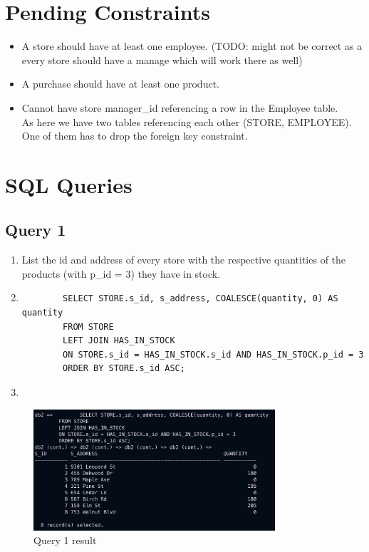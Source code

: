 \documentclass[a4paper,11pt]{article}
\begin{document}
\section{Pending Constraints}
\begin{itemize}
    \item A store should have at least one employee. (TODO: might not be correct as a every store should have a manage which will work there as well)
    \item A purchase should have at least one product.
    \item Cannot have store manager\_id referencing a row in the Employee table.\\
        As here we have two tables referencing each other (STORE, EMPLOYEE).\\
        One of them has to drop the foreign key constraint.

\end{itemize}

\section{SQL Queries}
\subsection*{Query 1}
\begin{enumerate}[label=(\alph*)]
    \item List the id and address of every store with the respective quantities of the products (with p\_id = 3) they have in stock.
    \item
        \begin{lstlisting}
        SELECT STORE.s_id, s_address, COALESCE(quantity, 0) AS quantity
        FROM STORE
        LEFT JOIN HAS_IN_STOCK
        ON STORE.s_id = HAS_IN_STOCK.s_id AND HAS_IN_STOCK.p_id = 3
        ORDER BY STORE.s_id ASC;
        \end{lstlisting}
    \item
\end{enumerate}
\begin{figure}[H]
    \centering
    \includegraphics[width=0.8\textwidth]{query1.png}
    \caption{Query 1 result}
\end{figure}
\end{document}
